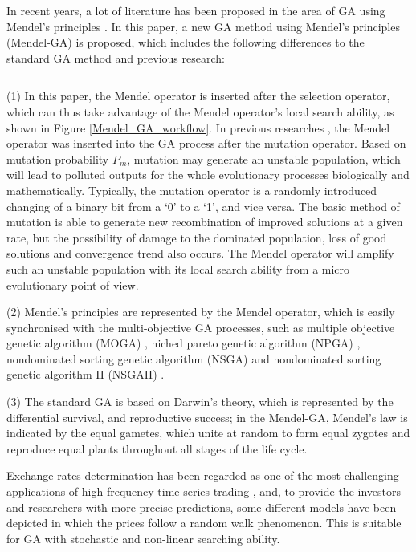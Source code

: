 In recent years, a lot of literature has been proposed in the area
of GA using Mendel's principles \cite{Mendel1865,O'Neil2009,Song1999,Park2001,Kadrovach2001,Kadrovach2002}. In this paper, a new GA
method using Mendel's principles (Mendel-GA) is proposed,
which includes the following differences to the standard GA method and
previous research:
\begin{list}{$$}
%
\item (1) In
this paper, the Mendel operator is inserted after the selection
operator, which can thus take advantage of the Mendel operator's local search
ability, as shown in Figure \ref{Mendel_GA_workflow}. In previous researches \cite{Song1999,Park2001,Kadrovach2001,Kadrovach2002}, the Mendel operator was
inserted into the GA process after the mutation operator. Based on mutation probability $P_m$, mutation may generate an unstable
population, which will lead to polluted outputs for the whole evolutionary processes biologically and mathematically\cite{Ishibuchi2002,Furi2005}. Typically, the mutation operator is a randomly introduced changing of a binary bit from a `0' to
a `1', and vice versa. The basic method of mutation is able to generate new recombination of improved solutions at a given rate, but the possibility of damage to the dominated population, loss of good solutions and convergence trend also occurs\cite{Zitzler1999,NAS2004,Haupt2004}. The Mendel operator will amplify such an unstable population
with its local search ability from a micro evolutionary point of view. 
%
\item (2) Mendel's principles are represented by the Mendel
operator, which is easily synchronised with the multi-objective
GA processes, such as multiple objective genetic algorithm (MOGA)
\cite{MOGA1993}, niched pareto genetic algorithm (NPGA)
\cite{NPGA1994}, nondominated sorting genetic algorithm (NSGA)
\cite{NSGA1994} and nondominated sorting genetic algorithm II
(NSGAII) \cite{NSGAII2002}.
%
\item (3) The standard GA is based on Darwin's theory, which is
represented by the differential survival, and reproductive success;
in the Mendel-GA, Mendel's law is indicated by the equal
gametes, which unite at random to form equal zygotes and reproduce
equal plants throughout all stages of the life cycle.
%
\end{list}


Exchange rates determination has been regarded as one of the most
challenging applications of high frequency time series trading
\cite{Lyons2001,Killeen2001,Payne2003,Tenti1996,Gujarati2004}, and, to provide the investors and researchers with more
precise predictions, some different models have
been depicted in which the prices follow a random walk
phenomenon. This is suitable for GA with stochastic and non-linear
searching ability.

